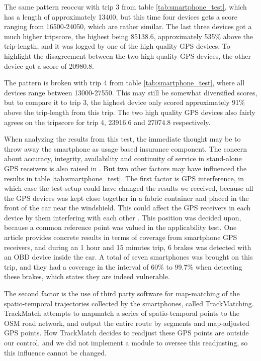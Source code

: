 The same pattern reoccur with trip 3 from table \ref{tab:smartphone_test}, which has a length of approximately 13400, but this time four devices gets a score ranging from 16500-24050, which are rather similar. The last three devices got a much higher tripscore, the highest being 85138.6, approximately 535\% above the trip-length, and it was logged by one of the high quality GPS devices. To highlight the disagreement between the two high quality GPS devices, the other device got a score of 20980.8. 

The pattern is broken with trip 4 from table \ref{tab:smartphone_test}, where all devices range between 13000-27550. This may still be somewhat diversified scores, but to compare it to trip 3, the highest device only scored approximately 91\% above the trip-length from this trip. The two high quality GPS devices also fairly agrees on the tripscore for trip 4, 23916.6 and 27074.8 respectively. 

When analyzing the results from this test, the immediate thought may be to throw away the smartphone as usage based insurance component. The concern about accuracy, integrity, availability and continuity of service in stand-alone GPS receivers is also raised in\citep{art:challenges_smartphone_ubi} \citep{art:survey_mobile_phone_sensing} \citep{art:smartphones_for_monitoring_and_ubi} \citep{art:insurtelematics} \citep{art:in-car_positioning_technologies}. But two other factors may have influenced the results in table \ref{tab:smartphone_test}. The first factor is GPS interference, in which case the test-setup could have changed the results we received, because all the GPS devices was kept close together in a fabric container and placed in the front of the car near the windshield. This could affect the GPS receivers in each device by them interfering with each other\citep{art:gps_interference_one} \citep{art:gps_interference_two}. This position was decided upon, because a common reference point was valued in the applicability test. One article provides concrete results in terms of coverage from smartphone GPS receivers, and during an 1 hour and 15 minutes trip, 6 brakes was detected with an OBD device inside the car. A total of seven smartphones was brought on this trip, and they had a coverage in the interval of 60\% to 99.7\% when detecting these brakes\citep{art:insurtelematics}, which states they are indeed vulnerable.

The second factor is the use of third party software for map-matching of the spatio-temporal trajectories collected by the smartphones, called TrackMatching\citep{trackmatch}. TrackMatch attempts to mapmatch a series of spatio-temporal points to the OSM road network, and output the entire route by segments and map-adjusted GPS points. How TrackMatch decides to readjust these GPS points are outside our control, and we did not implement a module to oversee this readjusting, so this influence cannot be changed. 

